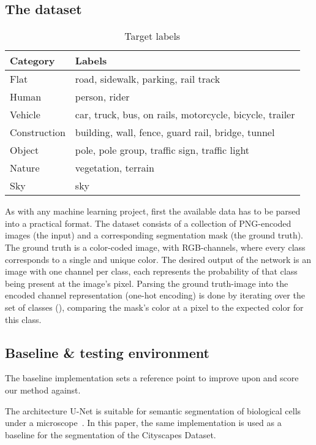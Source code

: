 \subsection{The dataset}
\label{sec:dataset}

\begin{table}
    \centering
    \caption{Target labels}
    \label{tab:labels}
    \begin{tabular}{ll}
        \hline
        Category    & Labels \\
        \hline
        Flat        & road, sidewalk, parking, rail track \\
        Human       & person, rider \\
        Vehicle     & car, truck, bus, on rails, motorcycle, bicycle, trailer \\
        Construction& building, wall, fence, guard rail, bridge, tunnel \\
        Object      & pole, pole group, traffic sign, traffic light \\
        Nature      & vegetation, terrain \\
        Sky	        & sky \\
        \hline
    \end{tabular}
\end{table}

As with any machine learning project, first the available data has to be parsed into a practical format.
The dataset consists of a collection of PNG-encoded images (the input) and a corresponding segmentation mask (the ground truth). 
The ground truth is a color-coded image, with RGB-channels, where every class corresponds to a single and unique color. 
The desired output of the network is an image with one channel per class, each represents the probability of that class being present at the image's pixel.
Parsing the ground truth-image into the encoded channel representation (one-hot encoding) is done by iterating over the set of classes (), comparing the mask's color at a pixel to the expected color for this class.

\subsection{Baseline \& testing environment}
\label{subsec:baseline}

The baseline implementation sets a reference point to improve upon and score our method against.

The architecture U-Net is suitable for semantic segmentation of biological cells under a microscope~\cite{RonnebergerFB15}. 
In this paper, the same implementation is used as a baseline for the segmentation of the Cityscapes Dataset.

